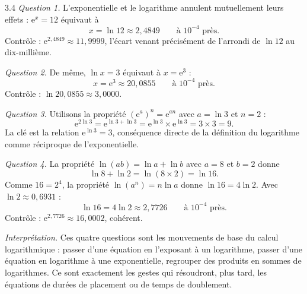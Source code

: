 \begin{corrige}{3.4}
\emph{Question 1.} L'exponentielle et le logarithme annulent mutuellement leurs effets : $\mathrm{e}^{x} = 12$ équivaut à
\[
x = \ln 12 \approx 2{,}4849 \qquad \text{à } 10^{-4} \text{ près}.
\]
Contrôle : $\mathrm{e}^{2{,}4849} \approx 11{,}9999$, l'écart venant précisément de l'arrondi de $\ln 12$ au dix-millième.

\emph{Question 2.} De même, $\ln x = 3$ équivaut à $x = \mathrm{e}^{3}$ :
\[
x = \mathrm{e}^{3} \approx 20{,}0855 \qquad \text{à } 10^{-4} \text{ près}.
\]
Contrôle : $\ln 20{,}0855 \approx 3{,}0000$.

\emph{Question 3.} Utilisons la propriété $(\mathrm{e}^{a})^{n} = \mathrm{e}^{a n}$ avec $a = \ln 3$ et $n = 2$ :
\[
\mathrm{e}^{2\ln 3} = \mathrm{e}^{\ln 3 + \ln 3} = \mathrm{e}^{\ln 3} \times \mathrm{e}^{\ln 3} = 3 \times 3 = 9.
\]
La clé est la relation $\mathrm{e}^{\ln 3} = 3$, conséquence directe de la définition du logarithme comme réciproque de l'exponentielle.

\emph{Question 4.} La propriété $\ln(ab) = \ln a + \ln b$ avec $a = 8$ et $b = 2$ donne
\[
\ln 8 + \ln 2 = \ln(8 \times 2) = \ln 16.
\]
Comme $16 = 2^{4}$, la propriété $\ln(a^{n}) = n\ln a$ donne $\ln 16 = 4\ln 2$. Avec $\ln 2 \approx 0{,}6931$ :
\[
\ln 16 = 4 \ln 2 \approx 2{,}7726 \qquad \text{à } 10^{-4} \text{ près}.
\]
Contrôle : $\mathrm{e}^{2{,}7726} \approx 16{,}0002$, cohérent.

\emph{Interprétation.} Ces quatre questions sont les mouvements de base du calcul logarithmique : passer d'une équation en l'exposant à un logarithme, passer d'une équation en logarithme à une exponentielle, regrouper des produits en sommes de logarithmes. Ce sont exactement les gestes qui résoudront, plus tard, les équations de durées de placement ou de temps de doublement.
\end{corrige}

